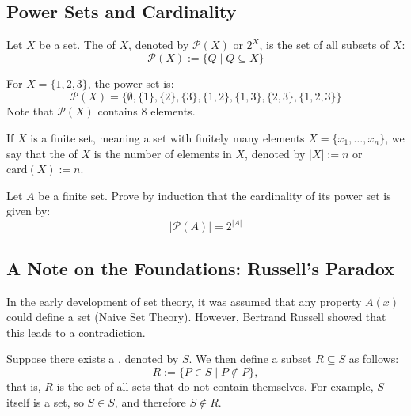 \subsection{Power Sets and Cardinality}

\begin{definition}
\label{def:power_set}
Let $X$ be a set. The  of $X$, denoted by $\mathcal{P}(X)$ or $2^X$, is the set of all subsets of $X$:
\[
\mathcal{P}(X) := \{Q \mid Q \subseteq X\}
\]
\end{definition}

\begin{example}
For $X = \{1, 2, 3\}$, the power set is:
\[
\mathcal{P}(X) = \{\emptyset, \{1\}, \{2\}, \{3\}, \{1, 2\}, \{1, 3\}, \{2, 3\}, \{1, 2, 3\}\}
\]
Note that $\mathcal{P}(X)$ contains $8$ elements.
\end{example}

\begin{definition}[Cardinality]
\label{def:cardinality}
If $X$ is a finite set, meaning a set with finitely many elements $X = \{x_1, \dots, x_n\}$, we say that the  of $X$ is the number of elements in $X$, denoted by $|X| := n$ or $\text{card}(X) := n$.
\end{definition}

\begin{exercise}
\label{exc:power_set_cardinality}
Let $A$ be a finite set. Prove by induction that the cardinality of its power set is given by:
\[
|\mathcal{P}(A)| = 2^{|A|}
\]
\end{exercise}

\subsection{A Note on the Foundations: Russell's Paradox}

In the early development of set theory, it was assumed that any property $A(x)$ could define a set (Naive Set Theory). However, Bertrand Russell showed that this leads to a contradiction.

Suppose there exists a , denoted by $S$. We then define a subset $R \subseteq S$ as follows:
\[
R := \{P \in S \mid P \notin P\},
\]
that is, $R$ is the set of all sets that do not contain themselves. For example, $S$ itself is a set, so $S \in S$, and therefore $S \notin R$.

